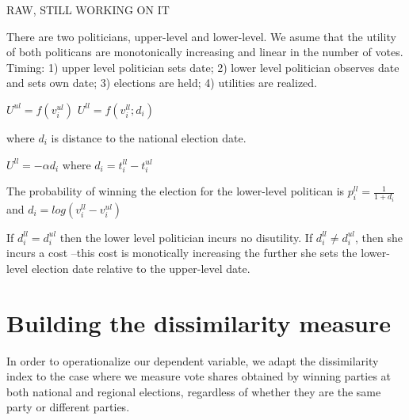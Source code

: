 \documentclass[a4paper,12pt]{article}
\begin{document}
 RAW, STILL WORKING ON IT

There are two politicians, upper-level and lower-level. We asume that
the utility of both politicans are monotonically increasing and linear
in the number of votes. Timing: 1) upper level politician sets date;
2) lower level politician observes date and sets own date; 3)
elections are held; 4) utilities are realized.

$U^{ul}=f(v^{ul}_i)$
$U^{ll}=f(v^{ll}_i;d_i)$

where $d_{i}$ is distance to the national election date.

$U^{ll}=-\alpha d_{i}$ where $d_{i}=t_{i}^{ll}-t_{i}^{ul}$

The probability of winning the election for the lower-level politican
is $p^{ll}_{i}=\frac{1}{1+d_{i}}$ and $d_{i}=log(v_{i}^{ll}-v_{i}^{ul})$

If $d_i^{ll}=d^{ul}_i$ then the lower level politician incurs no
disutility. If $d_i^{ll}\neq d^{ul}_i$, then she incurs a cost --this
cost is monotically increasing the further she sets the lower-level election date
relative to the upper-level date.

\section{Building the dissimilarity measure}

In order to operationalize our dependent variable, we adapt the
dissimilarity index to the case where we measure vote shares obtained by winning parties
at both national and regional elections, regardless of whether they
are the same party or different parties.
\end{document}
